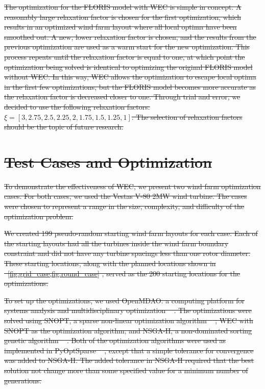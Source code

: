 \documentclass[a4paper]{jpconf}
\providecommand{\DIFdel}[1]{{\protect\color{red}\sout{#1}}}                      %
\begin{document}
\DIFdel{The optimization for the FLORIS model with WEC is simple in concept. A reasonably large relaxation factor is chosen for the first optimization, which results in an optimized wind farm layout where all local optima have been smoothed out. A new, lower relaxation factor is chosen, and the results from the previous optimization are used as a warm start for the new optimization. This process repeats until the relaxation factor is equal to one, at which point the optimization being solved is identical to optimizing the original FLORIS model without WEC. In this way, WEC allows the optimization to escape local optima in the first few optimizations, but the FLORIS model becomes more accurate as the relaxation factor is decreased closer to one. Through trial and error, we decided to use the following relaxation factors: $\xi = [3, 2.75, 2.5, 2.25, 2, 1.75, 1.5, 1.25, 1]$. The selection of relaxation factors should be the topic of future research.
}%

\section{\DIFdel{Test Cases and Optimization}}
\addtocounter{section}{-1}%
\DIFdel{To demonstrate the effectiveness of WEC, we present two wind farm optimization cases. For both cases, we used the Vestas V-80 2MW wind turbine. The cases were chosen to represent a range in the size, complexity, and difficulty of the optimization problem.
}%

\DIFdel{We created 199 pseudo-random starting wind farm layouts for each case. Each of the starting layouts had all the turbines inside the wind farm boundary constraint and did not have any turbine spacings less than one rotor diameter. These starting locations, along with the planned locations shown in \mbox{%
\cref{fig:grid_case,fig:round_case}}\hspace{0pt}%
, served as the 200 starting locations for the optimizations.
}%

\DIFdel{To set up the optimizations, we used OpenMDAO: a computing platform for systems analysis and multidisciplinary optimization \mbox{%
\cite{gray2010_OpenMDAO}}\hspace{0pt}%
. The optimizations were solved using SNOPT, a sparse non-linear optimization algorithm \mbox{%
\cite{gill2005}}\hspace{0pt}%
; WEC with SNOPT as the optimization algorithm; 
and NSGA-II, a non-dominated sorting genetic algorithm \mbox{%
\cite{deb2002_nsga2}}\hspace{0pt}%
. Both of the optimization algorithms were used as implemented in PyOptSparse \mbox{%
\cite{ruben2012_pyopt}}\hspace{0pt}%
, except that a simple tolerance for convergence was added to NSGA-II. The added tolerance in NSGA-II required that the best solution not change more than some specified value for a minimum number of generations. 
}%
\end{document}
